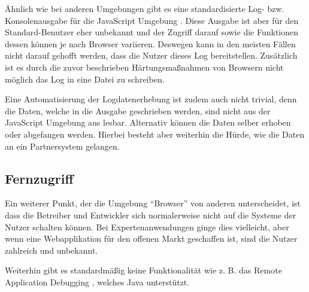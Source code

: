 Ähnlich wie bei anderen Umgebungen gibt es eine standardisierte Log- bzw. Konsolenausgabe für die JavaScript Umgebung \cite{MDNConsole}. Diese Ausgabe ist aber für den Standard-Benutzer eher unbekannt und der Zugriff darauf sowie die Funktionen dessen können je nach Browser variieren. Deswegen kann in den meisten Fällen nicht darauf gehofft werden, dass die Nutzer dieses Log bereitstellen. Zusätzlich ist es durch die zuvor beschrieben Härtungsmaßnahmen von Browsern nicht möglich das Log in eine Datei zu schreiben.

Eine Automatisierung der Logdatenerhebung ist zudem auch nicht trivial, denn die Daten, welche in die Ausgabe geschrieben werden, sind nicht aus der JavaScript Umgebung aus lesbar. Alternativ können die Daten selber erhoben oder abgefangen werden. Hierbei besteht aber weiterhin die Hürde, wie die Daten an ein Partnersystem gelangen.

\subsection{Fernzugriff}

Ein weiterer Punkt, der die Umgebung \enquote{Browser} von anderen unterscheidet, ist dass die Betreiber und Entwickler sich normalerweise nicht auf die Systeme der Nutzer schalten können. Bei Expertenanwendungen ginge dies vielleicht, aber wenn eine Webapplikation für den offenen Markt geschaffen ist, sind die Nutzer zahlreich und unbekannt.

Weiterhin gibt es standardmäßig keine Funktionalität wie z. B. das Remote Application Debugging \cite{JavaDebugWireProtocol}, welches Java unterstützt.